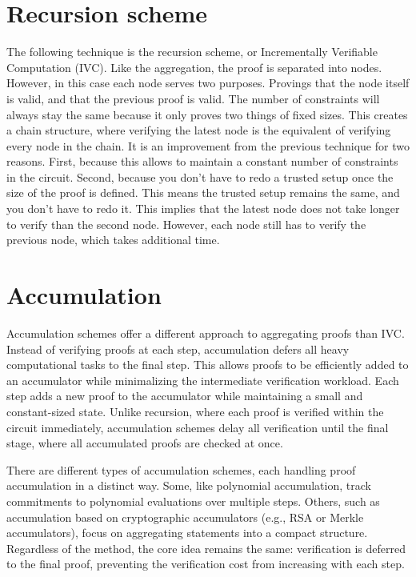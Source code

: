 \section{Recursion scheme}
The following technique is the recursion scheme, or Incrementally Verifiable Computation (IVC). Like the aggregation, the proof is separated into nodes.
However, in this case each node serves two purposes. Provings that the node itself is valid, and that the previous proof is valid.
The number of constraints will always stay the same because it only proves two things of fixed sizes. This creates
a chain structure, where verifying the latest node is the equivalent of verifying every node in the chain.
It is an improvement from the previous technique for two reasons.
First, because this allows to maintain a constant number of constraints in the circuit.
Second, because you don't have to redo a trusted setup once the size of the proof is defined.
This means the trusted setup remains the same, and you don't have to redo it.
This implies that the latest node does not take longer to verify than the second node.
However, each node still has to verify the previous node, which takes additional time. \cite{Nova23}


\section{Accumulation}
Accumulation schemes offer a different approach to aggregating proofs than IVC. 
Instead of verifying proofs at each step, accumulation defers all heavy computational tasks to the final step.
This allows proofs to be efficiently added to an accumulator while minimalizing the intermediate verification workload. 
Each step adds a new proof to the accumulator while maintaining a small and constant-sized state. 
Unlike recursion, where each proof is verified within the circuit immediately, accumulation schemes delay all verification until the final stage, 
where all accumulated proofs are checked at once.

There are different types of accumulation schemes, each handling proof accumulation in a distinct way.
Some, like polynomial accumulation, track commitments to polynomial evaluations over multiple steps. 
Others, such as accumulation based on cryptographic accumulators (e.g., RSA or Merkle accumulators), focus on aggregating statements into a compact structure. 
Regardless of the method, the core idea remains the same: verification is deferred to the final proof, preventing the verification cost from increasing with each step.

